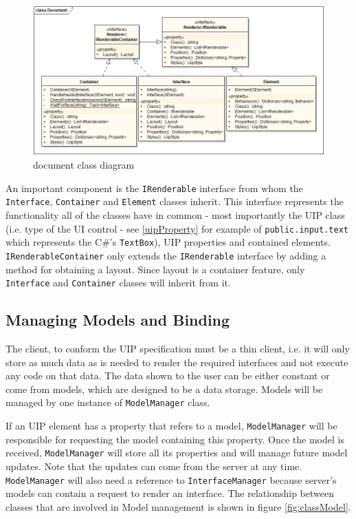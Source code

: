 \begin{figure}[ht!]
\centering
\includegraphics[width=145mm]{pics/3/classDocument.png}
\caption{document class diagram}
\label{fig:classDocument}
\end{figure}

An important component is the \texttt{IRenderable} interface from whom the \texttt{Interface}, \texttt{Container} and \texttt{Element} classes inherit. This interface represents the functionality all of the classes have in common - most importantly the UIP class (i.e. type of the UI control - see \ref{uipProperty} for example of \texttt{public.input.text} which represents the C\#'s \texttt{TextBox}), UIP properties and contained elements. \texttt{IRenderableContainer} only extends the \texttt{IRenderable} interface by adding a method for obtaining a layout. Since layout is a container feature, only \texttt{Interface} and \texttt{Container} classes will inherit from it.

\subsection{Managing Models and Binding}
The client, to conform the UIP specification must be a thin client, i.e. it will only store as much data as is needed to render the required interfaces and not execute any code on that data. The data shown to the user can be either constant or come from models, which are designed to be a data storage. Models will be managed by one instance of \texttt{ModelManager} class.

If an UIP element has a property that refers to a model, \texttt{ModelManager} will be responsible for requesting the model containing this property. Once the model is received, \texttt{ModelManager} will store all its properties and will manage future model updates. Note that the updates can come from the server at any time. \texttt{ModelManager} will also need a reference to \texttt{InterfaceManager} because server's models can contain a request to render an interface. The relationship between classes that are involved in Model management is shown in figure \ref{fig:classModel}.


